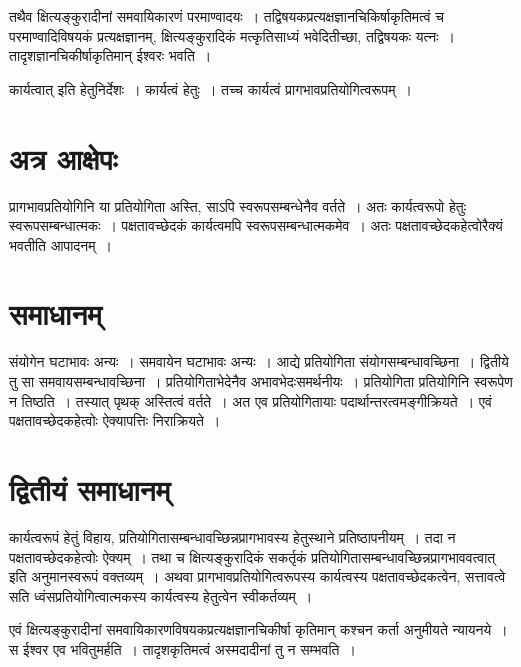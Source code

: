 {तथैव क्षित्यङ्कुरादीनां समवायिकारणं परमाण्वादयः~। तद्विषयकप्रत्यक्षज्ञानचिकिर्षा\-कृतिमत्वं च परमाण्वादिविषयकं प्रत्यक्षज्ञानम्, क्षित्यङ्कुरादिकं मत्कृतिसाध्यं भवेदितीच्छा, तद्विषयकः यत्नः~। तादृशज्ञानचिकीर्षाकृतिमान् ईश्वरः भवति~। 

कार्यत्वात् इति हेतुनिर्देशः~। कार्यत्वं हेतुः~। तच्च कार्यत्वं प्रागभावप्रतियोगित्वरूपम्~। 

\section*{अत्र आक्षेपः} 

प्रागभावप्रतियोगिनि या प्रतियोगिता अस्ति, साऽपि स्वरूपसम्बन्धेनैव वर्तते~। अतः कार्यत्व\-रूपो हेतुः स्वरूपसम्बन्धात्मकः~। पक्षतावच्छेदकं कार्यत्वमपि स्वरूपसम्बन्धात्मकमेव~। अतः पक्षतावच्छेदकहेत्वोरैक्यं भवतीति आपादनम्~। 

\section*{समाधानम्} 

संयोगेन घटाभावः अन्यः~। समवायेन घटाभावः अन्यः~। आद्ये प्रतियोगिता संयोगसम्बन्धा\-वच्छिना~। द्वितीये तु सा समवायसम्बन्धावच्छिना~। प्रतियोगिताभेदेनैव अभावभेदः\break समर्थनीयः~। प्रतियोगिता प्रतियोगिनि स्वरूपेण न तिष्ठति~। तस्यात् पृथक् अस्तित्वं वर्तते~। अत एव प्रतियोगितायाः पदार्थान्तरत्वमङ्गीक्रियते~। एवं पक्षतावच्छेदकहेत्वोः ऐक्यापत्तिः निराक्रियते~। 

\section*{द्वितीयं समाधानम्} 

कार्यत्वरूपं हेतुं विहाय, प्रतियोगितासम्बन्धावच्छिन्नप्रागभावस्य हेतुस्थाने प्रतिष्ठापनीयम्~। तदा न पक्षतावच्छेदकहेत्वोः ऐक्यम्~। तथा च क्षित्यङ्कुरादिकं सकर्तृकं प्रतियोगितासम्बन्धावच्छिन्नप्रागभाववत्वात् इति अनुमानस्वरूपं वक्तव्यम्~। अथवा प्रागभावप्रतियोगित्वरूपस्य कार्यत्वस्य पक्षतावच्छेदकत्वेन, सत्तावत्वे सति ध्वंसप्रतियोगित्वात्मकस्य कार्यत्वस्य हेतुत्वेन स्वीकर्तव्यम्~। 

एवं क्षित्यङ्कुरादीनां समवायिकारणविषयकप्रत्यक्षज्ञानचिकीर्षा कृतिमान् कश्चन कर्ता अनुमीयते न्यायनये~। स ईश्वर एव भवितुमर्हति~। तादृशकृतिमत्वं अस्मदादीनां तु न सम्भवति~। 

\articleend
}
